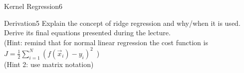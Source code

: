 \begin{questions}
\begin{question}{Kernel Regression}{6}
\begin{answer}\end{answer}
	\end{question}
	
	
	
	\begin{question}[bonus]{Derivation}{5}
		Explain the concept of ridge regression and why/when it is used.
		Derive its final equations presented during the lecture.\\
		(Hint: remind that for normal linear regression the cost function is $J = \frac{1}{2}\sum_{i=1}^N ( f(\vec x_i) - y_i ) ^2 \,$ )\\
		(Hint 2: use matrix notation)
		
\begin{answer}\end{answer}
	\end{question}	
	
\end{questions}

